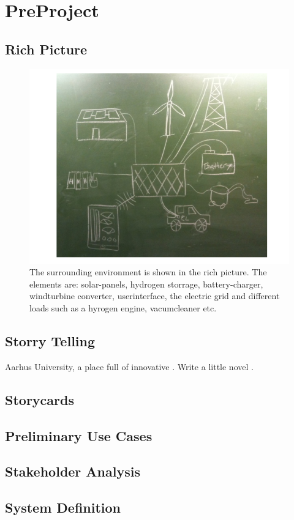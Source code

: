 \section{PreProject}
\subsection{Rich Picture}

\begin{figure}[h!]
	\centering
		\includegraphics[width=1\textwidth]{images/rich_picture.png}
	\caption{The surrounding environment is shown in the rich picture. The
 			 elements are: solar-panels, hydrogen storrage, battery-charger, windturbine
 			 converter, userinterface, the electric grid and different loads such as a
 			 hyrogen engine, vacumcleaner etc. }
\end{figure}

\subsection{Storry Telling}
Aarhus University, a place full of innovative . Write a little novel .

\subsection{Storycards}

\subsection{Preliminary Use Cases}

\subsection{Stakeholder Analysis}

\subsection{System Definition}
